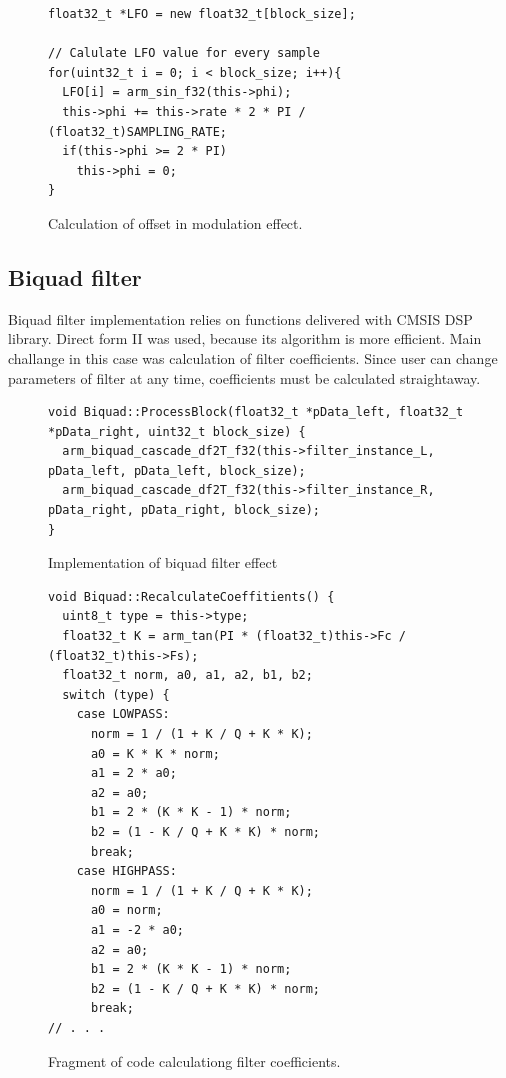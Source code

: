 \documentclass[a4paper,twoside,12pt]{book}
\begin{document}
\begin{figure}[H]
\centering
\begin{lstlisting}
float32_t *LFO = new float32_t[block_size];

// Calulate LFO value for every sample
for(uint32_t i = 0; i < block_size; i++){
  LFO[i] = arm_sin_f32(this->phi);
  this->phi += this->rate * 2 * PI / (float32_t)SAMPLING_RATE;
  if(this->phi >= 2 * PI)
    this->phi = 0;
}
\end{lstlisting}
\caption{Calculation of offset in modulation effect.}
\label{fig:modul}
\end{figure}

\subsection{Biquad filter}
Biquad filter implementation relies on functions
delivered with CMSIS DSP library.
Direct form II was used, because its algorithm is more efficient.
Main challange in this case was calculation of filter coefficients.
Since user can change parameters of filter at any time,
coefficients must be calculated straightaway.

\begin{figure}[H]
\centering
\begin{lstlisting}
void Biquad::ProcessBlock(float32_t *pData_left, float32_t *pData_right, uint32_t block_size) {
  arm_biquad_cascade_df2T_f32(this->filter_instance_L, pData_left, pData_left, block_size);
  arm_biquad_cascade_df2T_f32(this->filter_instance_R, pData_right, pData_right, block_size);
}
\end{lstlisting}
\caption{Implementation of biquad filter effect}
\label{fig:Biq}
\end{figure}

\begin{figure}[H]
\centering
\begin{lstlisting}
void Biquad::RecalculateCoeffitients() {
  uint8_t type = this->type;
  float32_t K = arm_tan(PI * (float32_t)this->Fc / (float32_t)this->Fs);
  float32_t norm, a0, a1, a2, b1, b2;
  switch (type) {
    case LOWPASS:
      norm = 1 / (1 + K / Q + K * K);
      a0 = K * K * norm;
      a1 = 2 * a0;
      a2 = a0;
      b1 = 2 * (K * K - 1) * norm;
      b2 = (1 - K / Q + K * K) * norm;
      break;
    case HIGHPASS:
      norm = 1 / (1 + K / Q + K * K);
      a0 = norm;
      a1 = -2 * a0;
      a2 = a0;
      b1 = 2 * (K * K - 1) * norm;
      b2 = (1 - K / Q + K * K) * norm;
      break;
// . . .
\end{lstlisting}
\caption{Fragment of code calculationg filter coefficients.}
\label{fig:Biq2}
\end{figure}
\end{document}
